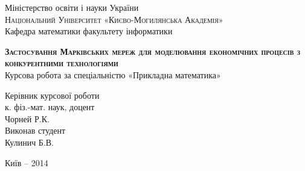 \begin{titlepage}
\newpage

\begin{center}
Міністерство освіти і науки України \\
\textsc{Національний Університет «Києво-Могилянська Академія»} \\
Кафедра математики факультету інформатики
\end{center}

\vspace{8em}

\vspace{2em}

\begin{center}
\textsc{\textbf{Застосування Марківських мереж для моделювання економічних процесів з конкурентними технологіями}} \\
Курсова робота за спеціальністю «Прикладна математика»
\end{center}

\vspace{6em}

\begin{flushright}
Керівник курсової роботи \\
к. фіз.-мат. наук, доцент \\
Чорней Р.К. \\
\vspace{2em}
Виконав студент \\
Кулинич Б.В. \\
\vspace{2em}

\end{flushright}

\vspace{\fill}

\begin{center}
Київ – 2014
\end{center}

\end{titlepage}
